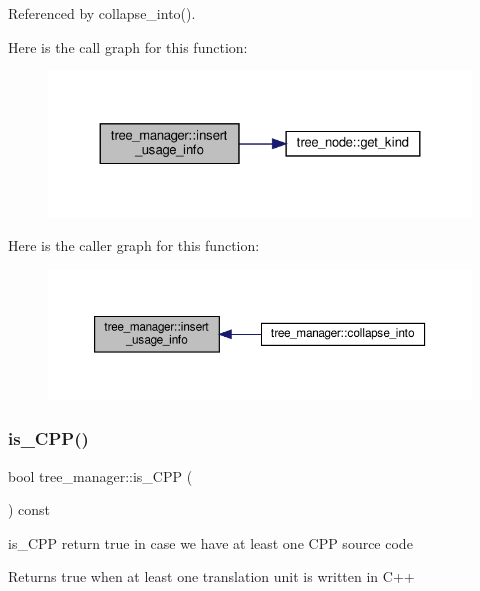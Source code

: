Referenced by collapse\+\_\+into().

Here is the call graph for this function\+:
\nopagebreak
\begin{figure}[H]
\begin{center}
\leavevmode
\includegraphics[width=324pt]{d2/ddd/classtree__manager_a3508317581f7ae086d2656abb90108e0_cgraph}
\end{center}
\end{figure}
Here is the caller graph for this function\+:
\nopagebreak
\begin{figure}[H]
\begin{center}
\leavevmode
\includegraphics[width=350pt]{d2/ddd/classtree__manager_a3508317581f7ae086d2656abb90108e0_icgraph}
\end{center}
\end{figure}
\mbox{\label{classtree__manager_aa773de2157d22f12e2b48a486dbc17aa}} 
\subsubsection{\texorpdfstring{is\+\_\+\+C\+P\+P()}{is\_CPP()}}
{\footnotesize\ttfamily bool tree\+\_\+manager\+::is\+\_\+\+C\+PP (\begin{DoxyParamCaption}{ }\end{DoxyParamCaption}) const}



is\+\_\+\+C\+PP return true in case we have at least one C\+PP source code 

\begin{DoxyReturn}{Returns}
true when at least one translation unit is written in C++ 
\end{DoxyReturn}


